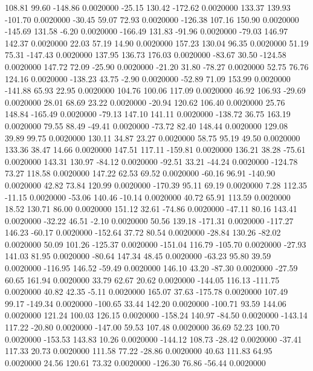  108.81   99.60 -148.86   0.0020000
  -25.15  130.42 -172.62   0.0020000
  133.37  139.93 -101.70   0.0020000
  -30.45   59.07   72.93   0.0020000
 -126.38  107.16  150.90   0.0020000
 -145.69  131.58   -6.20   0.0020000
 -166.49  131.83  -91.96   0.0020000
  -79.03  146.97  142.37   0.0020000
   22.03   57.19   14.90   0.0020000
  157.23  130.04   96.35   0.0020000
   51.19   75.31 -147.43   0.0020000
  137.95  136.73  176.03   0.0020000
  -83.67   30.50 -124.58   0.0020000
  147.72   72.09  -25.90   0.0020000
  -21.20   31.80  -78.27   0.0020000
   52.75   76.76  124.16   0.0020000
 -138.23   43.75   -2.90   0.0020000
  -52.89   71.09  153.99   0.0020000
 -141.88   65.93   22.95   0.0020000
  104.76  100.06  117.09   0.0020000
   46.92  106.93  -29.69   0.0020000
   28.01   68.69   23.22   0.0020000
  -20.94  120.62  106.40   0.0020000
   25.76  148.84 -165.49   0.0020000
  -79.13  147.10  141.11   0.0020000
 -138.72   36.75  163.19   0.0020000
   79.55   88.49  -49.41   0.0020000
  -73.72   82.40  148.44   0.0020000
  129.08   39.89   99.75   0.0020000
  130.11   34.87   23.27   0.0020000
   58.75   95.19   49.50   0.0020000
  133.36   38.47   14.66   0.0020000
  147.51  117.11 -159.81   0.0020000
  136.21   38.28  -75.61   0.0020000
  143.31  130.97  -84.12   0.0020000
  -92.51   33.21  -44.24   0.0020000
 -124.78   73.27  118.58   0.0020000
  147.22   62.53   69.52   0.0020000
  -60.16   96.91 -140.90   0.0020000
   42.82   73.84  120.99   0.0020000
 -170.39   95.11   69.19   0.0020000
    7.28  112.35  -11.15   0.0020000
  -53.06  140.46  -10.14   0.0020000
   40.72   65.91  113.59   0.0020000
   18.52  130.71   86.00   0.0020000
  151.12   32.61  -74.86   0.0020000
  -47.11   80.16  143.41   0.0020000
  -32.22   46.51   -2.10   0.0020000
   50.56  139.18 -171.31   0.0020000
 -117.27  146.23  -60.17   0.0020000
 -152.64   37.72   80.54   0.0020000
  -28.84  130.26  -82.02   0.0020000
   50.09  101.26 -125.37   0.0020000
 -151.04  116.79 -105.70   0.0020000
  -27.93  141.03   81.95   0.0020000
  -80.64  147.34   48.45   0.0020000
  -63.23   95.80   39.59   0.0020000
 -116.95  146.52  -59.49   0.0020000
  146.10   43.20  -87.30   0.0020000
  -27.59   60.65  161.94   0.0020000
   33.79   62.67   20.62   0.0020000
 -144.05  116.13 -111.75   0.0020000
   40.82   42.35   -5.11   0.0020000
  165.07   37.63 -175.78   0.0020000
  107.49   99.17 -149.34   0.0020000
 -100.65   33.44  142.20   0.0020000
 -100.71   93.59  144.06   0.0020000
  121.24  100.03  126.15   0.0020000
 -158.24  140.97  -84.50   0.0020000
 -143.14  117.22  -20.80   0.0020000
 -147.00   59.53  107.48   0.0020000
   36.69   52.23  100.70   0.0020000
 -153.53  143.83   10.26   0.0020000
 -144.12  108.73  -28.42   0.0020000
  -37.41  117.33   20.73   0.0020000
  111.58   77.22  -28.86   0.0020000
   40.63  111.83   64.95   0.0020000
   24.56  120.61   73.32   0.0020000
 -126.30   76.86  -56.44   0.0020000